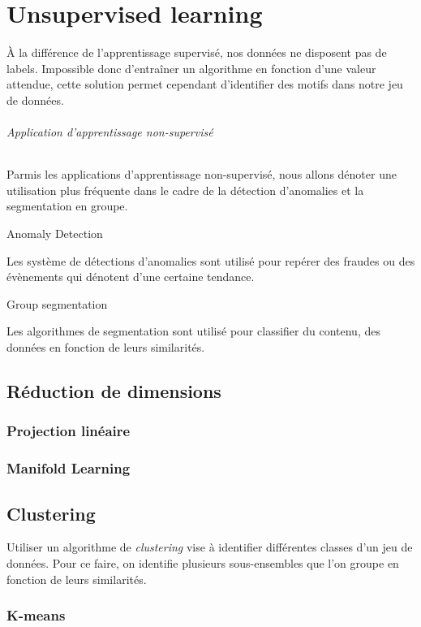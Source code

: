 \documentclass[../../cs-notes.tex]{subfiles}
\begin{document}
	\part{Unsupervised learning}

	À la différence de l'apprentissage supervisé, nos données ne disposent pas de labels.
	Impossible donc d'entraîner un algorithme en fonction d'une valeur attendue, cette solution permet cependant d'identifier des motifs dans notre jeu de données.

	\paragraph{Application d'apprentissage non-supervisé}
	Parmis les applications d'apprentissage non-supervisé, nous allons dénoter une utilisation plus fréquente dans le cadre de la détection d'anomalies et la segmentation en groupe.

	\subparagraph{Anomaly Detection} Les système de détections d'anomalies sont utilisé pour repérer des fraudes ou des évènements qui dénotent d'une certaine tendance.

	\subparagraph{Group segmentation}
	Les algorithmes de segmentation sont utilisé pour classifier du contenu, des données en fonction de leurs similarités.

	\chapter{Réduction de dimensions}
	\section{Projection linéaire}
	\section{Manifold Learning}


	\chapter{Clustering}
	Utiliser un algorithme de \textit{clustering} vise à identifier différentes classes d'un jeu de données.
	Pour ce faire, on identifie plusieurs sous-ensembles que l'on groupe en fonction de leurs similarités.

	\section{K-means}
\end{document}

